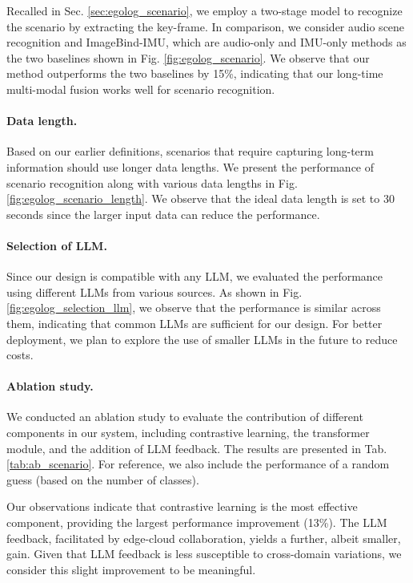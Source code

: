 Recalled in Sec. \ref{sec:egolog_scenario}, we employ a two-stage model to recognize the scenario by extracting the key-frame. In comparison, we consider audio scene recognition and ImageBind-IMU, which are audio-only and IMU-only methods
as the two baselines shown in Fig. \ref{fig:egolog_scenario}. We observe that our method outperforms the two baselines by 15\%, indicating that our long-time multi-modal fusion works well for scenario recognition. 

\paragraph{Data length.}
Based on our earlier definitions, scenarios that require capturing long-term information should use longer data lengths. We present the performance of scenario recognition along with various data lengths in Fig. \ref{fig:egolog_scenario_length}. We observe that the ideal data length is set to 30 seconds since the larger input data can reduce the performance.

\paragraph{Selection of LLM.}
Since our design is compatible with any LLM, we evaluated the performance using different LLMs from various sources. As shown in Fig. \ref{fig:egolog_selection_llm}, we observe that the performance is similar across them, indicating that common LLMs are sufficient for our design. For better deployment, we plan to explore the use of smaller LLMs in the future to reduce costs.

\paragraph{Ablation study.}
We conducted an ablation study to evaluate the contribution of different components in our system, including contrastive learning, the transformer module, and the addition of LLM feedback. The results are presented in Tab. \ref{tab:ab_scenario}. For reference, we also include the performance of a random guess (based on the number of classes).

Our observations indicate that contrastive learning is the most effective component, providing the largest performance improvement (13\%). The LLM feedback, facilitated by edge-cloud collaboration, yields a further, albeit smaller, gain. Given that LLM feedback is less susceptible to cross-domain variations, we consider this slight improvement to be meaningful.



